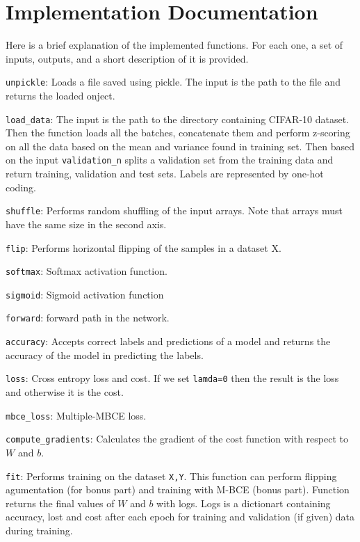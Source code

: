 \documentclass[a4paper]{article}
\begin{document}
\section{Implementation Documentation}
\label{sec:2}

Here is a brief explanation of the implemented functions. For each one, a set of inputs, outputs, and a short description of it is provided.

\lstinline[basicstyle=\color{red}]|unpickle|: Loads a file saved using pickle. The input is the path to the file and returns the loaded onject.

\lstinline[basicstyle=\color{red}]|load_data|: The input is the path to the directory containing CIFAR-10 dataset. Then the function loads all the batches, concatenate them and perform z-scoring on all the data based on the mean and variance found in training set. Then based on the input \lstinline[basicstyle=\color{red}]|validation_n| splits a validation set from the training data and return training, validation and test sets. Labels are represented by one-hot coding.

\lstinline[basicstyle=\color{red}]|shuffle|: Performs random shuffling of the input arrays. Note that arrays must have the same size in the second axis.

\lstinline[basicstyle=\color{red}]|flip|: Performs horizontal flipping of the samples in a dataset X.

\lstinline[basicstyle=\color{red}]|softmax|: Softmax activation function.

\lstinline[basicstyle=\color{red}]|sigmoid|: Sigmoid activation function

\lstinline[basicstyle=\color{red}]|forward|: forward path in the network.

\lstinline[basicstyle=\color{red}]|accuracy|: Accepts correct labels and predictions of a model and returns the accuracy of the model in predicting the labels.

\lstinline[basicstyle=\color{red}]|loss|: Cross entropy loss and cost. If we set \lstinline|lamda=0| then the result is the loss and otherwise it is the cost. 

\lstinline[basicstyle=\color{red}]|mbce_loss|: Multiple-MBCE loss.

\lstinline[basicstyle=\color{red}]|compute_gradients|: Calculates the gradient of the cost function with respect to $W$ and $b$.

\lstinline[basicstyle=\color{red}]|fit|: Performs training on the dataset \lstinline|X,Y|. This function can perform flipping agumentation (for bonus part) and training with M-BCE (bonus part). Function returns the final values of $W$ and $b$ with logs. Logs is a dictionart containing accuracy, lost and cost after each epoch for training and validation (if given) data during training.
\end{document}
